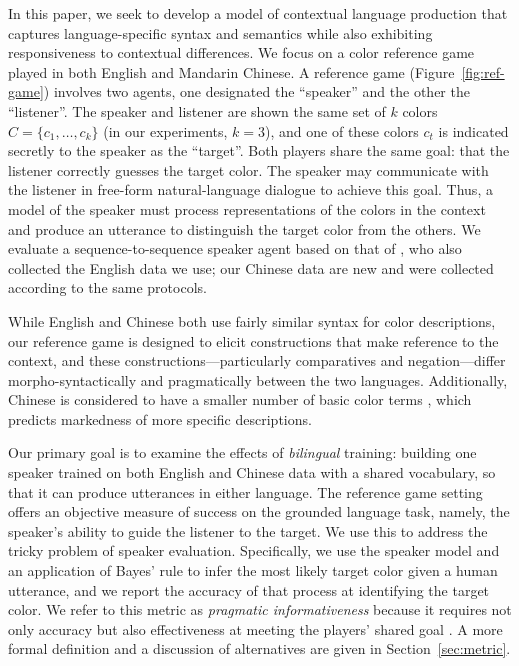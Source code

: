 \documentclass[11pt,a4paper]{article}
\renewcommand{\|}{\mid}
\newcommand{\figref}[1]{Figure~\ref{#1}}
\newcommand{\secref}[1]{Section~\ref{#1}}
\begin{document}
In this paper, we seek to develop a model of contextual language production that captures language-specific syntax and semantics while also exhibiting responsiveness to contextual differences. We focus on a color reference game \citep{Rosenberg:Cohen:1964,Dale:Reiter:1995,Krahmer:vanDeemter:2012}
played in both English and Mandarin Chinese.
A reference game (\figref{fig:ref-game}) involves two agents, one designated the ``speaker'' and the other the ``listener''. The
speaker and listener are shown the same set of $k$ colors $C = \{c_1, \dotsc, c_k\}$ (in our experiments, 
$k = 3$), and one of these
colors $c_t$ is indicated secretly to the speaker as the ``target''. Both players share the same goal:
that the listener correctly guesses the target color. The speaker may communicate with the listener in
free-form natural-language dialogue to achieve this goal. Thus, a model of the speaker must process representations of the colors in the context and produce an utterance to distinguish the target color from the others. We evaluate a sequence-to-sequence speaker agent based on that of \citet{Monroe2017}, who also collected the English data we use; our Chinese data are new and were collected according to the same protocols.

While English and Chinese both use fairly similar syntax for color descriptions, our reference game is designed to elicit constructions that make reference to the context, and these constructions---particularly comparatives and negation---differ morpho-syntactically and pragmatically between the two languages. Additionally, Chinese is considered to have a smaller number of basic color terms \citep{BerlinKay1969}, which predicts markedness of more specific descriptions. %

Our primary goal is to examine the effects of \emph{bilingual} training: building one speaker trained on both English and Chinese data with a shared vocabulary, so that it can produce utterances in either language.  
The reference game setting offers an objective measure of success on the grounded
language task, namely, the speaker's ability to guide the listener to the target. We use this to address the tricky problem of speaker evaluation. Specifically, we use the speaker model and an application of Bayes' rule to infer the most likely target color given a human utterance, and we report the accuracy of that process at identifying the target color. We refer to this metric as \emph{pragmatic informativeness} because it requires not only accuracy but also effectiveness at meeting the players' shared goal \citep{Grice75}. 
%
A more formal definition and a discussion of alternatives are given in \secref{sec:metric}.
\end{document}
